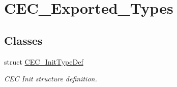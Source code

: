 \hypertarget{group__CEC__Exported__Types}{
\section{CEC\_\-Exported\_\-Types}
\label{group__CEC__Exported__Types}
}
\subsection*{Classes}
\begin{DoxyCompactItemize}
\item 
struct \hyperlink{structCEC__InitTypeDef}{CEC\_\-InitTypeDef}
\begin{DoxyCompactList}\small\item\em CEC Init structure definition. \item\end{DoxyCompactList}\end{DoxyCompactItemize}

